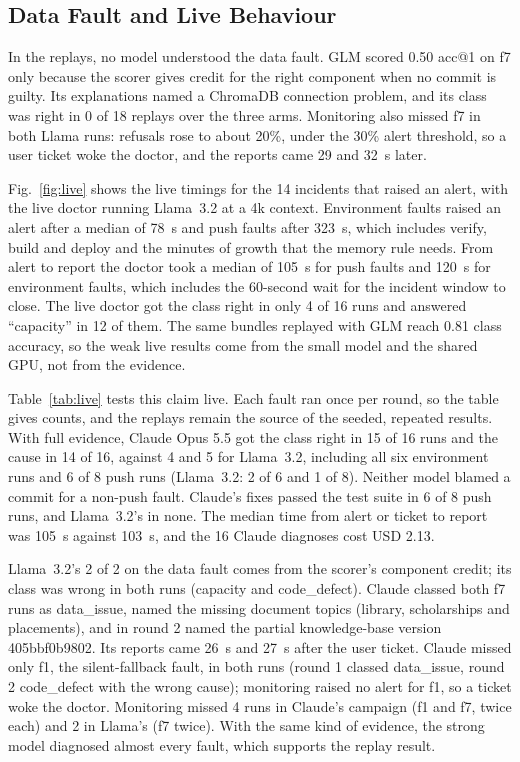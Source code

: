 \documentclass[12pt,onecolumn,draftclsnofoot]{IEEEtran}
\begin{document}
\subsection{Data Fault and Live Behaviour}
In the replays, no model understood the data fault. GLM scored 0.50 acc@1 on f7 only because the scorer gives credit for the right component when no commit is guilty. Its explanations named a ChromaDB connection problem, and its class was right in 0 of 18 replays over the three arms. Monitoring also missed f7 in both Llama runs: refusals rose to about 20\%, under the 30\% alert threshold, so a user ticket woke the doctor, and the reports came 29 and 32~s later.

Fig.~\ref{fig:live} shows the live timings for the 14 incidents that raised an alert, with the live doctor running Llama~3.2 at a 4k context. Environment faults raised an alert after a median of 78~s and push faults after 323~s, which includes verify, build and deploy and the minutes of growth that the memory rule needs. From alert to report the doctor took a median of 105~s for push faults and 120~s for environment faults, which includes the 60-second wait for the incident window to close. The live doctor got the class right in only 4 of 16 runs and answered ``capacity'' in 12 of them. The same bundles replayed with GLM reach 0.81 class accuracy, so the weak live results come from the small model and the shared GPU, not from the evidence.

Table~\ref{tab:live} tests this claim live. Each fault ran once per round, so the table gives counts, and the replays remain the source of the seeded, repeated results. With full evidence, Claude Opus 5.5 got the class right in 15 of 16 runs and the cause in 14 of 16, against 4 and 5 for Llama~3.2, including all six environment runs and 6 of 8 push runs (Llama~3.2: 2 of 6 and 1 of 8). Neither model blamed a commit for a non-push fault. Claude's fixes passed the test suite in 6 of 8 push runs, and Llama~3.2's in none. The median time from alert or ticket to report was 105~s against 103~s, and the 16 Claude diagnoses cost USD 2.13.

Llama~3.2's 2 of 2 on the data fault comes from the scorer's component credit; its class was wrong in both runs (capacity and code\_defect). Claude classed both f7 runs as data\_issue, named the missing document topics (library, scholarships and placements), and in round 2 named the partial knowledge-base version 405bbf0b9802. Its reports came 26~s and 27~s after the user ticket. Claude missed only f1, the silent-fallback fault, in both runs (round 1 classed data\_issue, round 2 code\_defect with the wrong cause); monitoring raised no alert for f1, so a ticket woke the doctor. Monitoring missed 4 runs in Claude's campaign (f1 and f7, twice each) and 2 in Llama's (f7 twice). With the same kind of evidence, the strong model diagnosed almost every fault, which supports the replay result.
\end{document}
